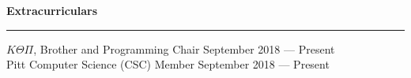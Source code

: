 \documentclass[11pt]{article}
\begin{document}
\begin{flushleft}
		\vspace{1.75mm}
		{\large \raggedright \textbf{Extracurriculars}}
		\vspace{1.5mm}
	
		\hrule
	
		\vspace{2.5mm}
		$K\Theta\Pi$, Brother and Programming Chair \hfill September 2018 --- Present\\
		Pitt Computer Science (CSC) Member \hfill September 2018 --- Present
	\end{flushleft}
\end{document}
